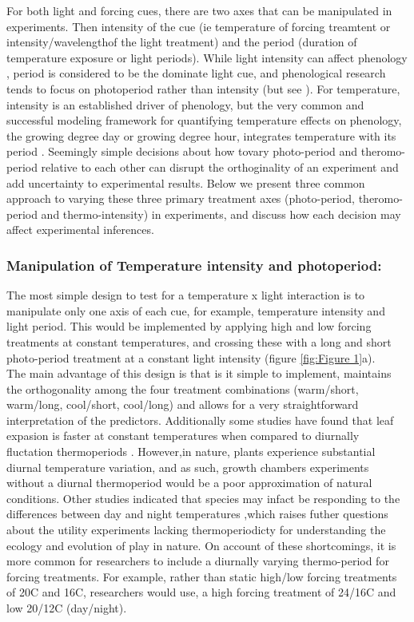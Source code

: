 \documentclass{article}[11pt]
\begin{document}
\noindent For both light and forcing cues, there are two axes that can be manipulated in experiments. Then intensity of the cue (ie temperature of forcing treamtent or intensity/wavelengthof the light treatment) and the period (duration of temperature exposure or light periods). While light intensity can affect phenology \citep{Brelsford2018,Cober1996}, period is considered to be the dominate light cue, and phenological research tends to focus on photoperiod rather than intensity (but see \citep{}). For temperature, intensity is an established driver of phenology, but the very common and successful modeling framework for quantifying temperature effects on phenology, the growing degree day or growing degree hour, integrates temperature with its period \citep{}. Seemingly simple decisions about how tovary photo-period and theromo-period relative to each other can disrupt the orthoginality of an experiment and add uncertainty to experimental results. Below we present three common approach to varying these three primary treatment axes (photo-period, theromo-period and thermo-intensity) in experiments, and discuss how each decision may affect experimental inferences.\\

\subsubsection*{Manipulation of Temperature intensity and photoperiod:}
\indent \indent The most simple design to test for a temperature x light interaction is to manipulate only one axis of each cue, for example, temperature intensity and light period. This would be implemented by applying high and low forcing treatments at constant temperatures, and crossing these with a long and short photo-period treatment at a constant light intensity (figure \ref{fig:Figure 1}a).\\
\indent The main advantage of this design is that is it simple to implement, maintains the orthogonality among the four treatment combinations (warm/short, warm/long, cool/short, cool/long) and allows for a very straightforward interpretation of the predictors. Additionally some studies have found that leaf expasion is faster at constant temperatures when compared to diurnally fluctation thermoperiods \citep{Erwin1995}. However,in nature, plants experience substantial diurnal temperature variation, and as such, growth chambers experiments without a diurnal thermoperiod would be a poor approximation of natural conditions. Other studies indicated that species may infact be responding to the differences between day and night temperatures \citep{Erwin1995},which raises futher questions about the utility experiments lacking thermoperiodicty for understanding the ecology and evolution of play in nature. On account of these shortcomings, it is more common for researchers to include a diurnally varying thermo-period for forcing treatments. For example, rather than static high/low forcing treatments of 20\degree C and 16\degree C, researchers would use, a high forcing treatment of 24\degree/16\degree C and low 20\degree/12\degree C (day/night).\\
\end{document}
